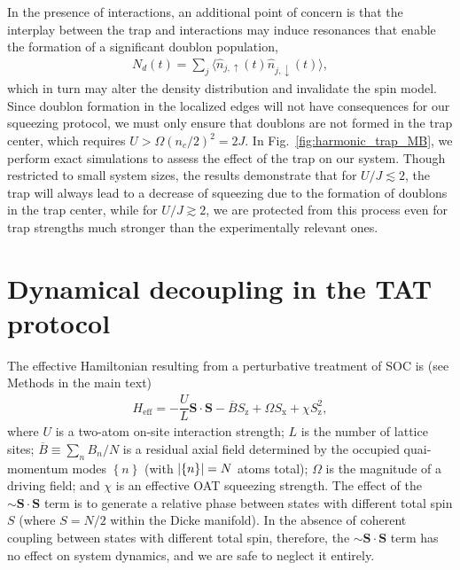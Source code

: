 \documentclass{nature}
\renewcommand{\t}{\text} %
\newcommand{\f}[2]{\dfrac{#1}{#2}} %
\renewcommand{\set}[1]{\left\{#1\right\}} %
\renewcommand{\c}{\cdot} %
\renewcommand{\v}{\bm} %
\newcommand{\z}{\text{z}}
\newcommand{\x}{\text{x}}
\begin{document}
In the presence of interactions, an additional point of concern is that the interplay between the trap and interactions may induce resonances that enable the formation of a significant doublon population,
\begin{align}
    N_d(t) = \sum_j \langle\hat{n}_{j,\uparrow}(t)\hat{n}_{j,
    \downarrow}(t) \rangle,
    \label{eq:doublon}
\end{align}
which in turn may alter the density distribution and invalidate the spin model. Since doublon formation in the localized edges will not have consequences for our squeezing protocol, we must only ensure that doublons are not formed in the trap center, which requires $U > \Omega (n_c/2)^2 = 2J$\cite{pupillo2006extended}. In Fig.~\ref{fig:harmonic_trap_MB}, we perform exact simulations to assess the effect of the trap on our system. Though restricted to small system sizes, the results demonstrate that for $U/J \lesssim 2$, the trap will always lead to a decrease of squeezing due to the formation of doublons in the trap center, while for $U/J \gtrsim 2$, we are protected from this process even for trap strengths much stronger than the experimentally relevant ones.


\section*{Dynamical decoupling in the TAT protocol}

The effective Hamiltonian resulting from a perturbative treatment of SOC is (see Methods in the main text)
\begin{align}
  H_{\t{eff}}
  = -\f{U}{L}\v S\c\v S - \overline B S_\z + \Omega S_\x + \chi S_\z^2,
  \label{eq:H_eff_DD}
\end{align}
where $U$ is a two-atom on-site interaction strength; $L$ is the number of lattice sites; $\overline B\equiv \sum_n B_n/N$ is a residual axial field determined by the occupied quai-momentum modes $\set{n}$ (with $\abs{\set{n}}=N$ atoms total); $\Omega$ is the magnitude of a driving field; and $\chi$ is an effective OAT squeezing strength.
The effect of the $\sim\v S\c\v S$ term is to generate a relative phase between states with different total spin $S$ (where $S=N/2$ within the Dicke manifold).
In the absence of coherent coupling between states with different total spin, therefore, the $\sim\v S\c\v S$ term has no effect on system dynamics, and we are safe to neglect it entirely.
\end{document}
